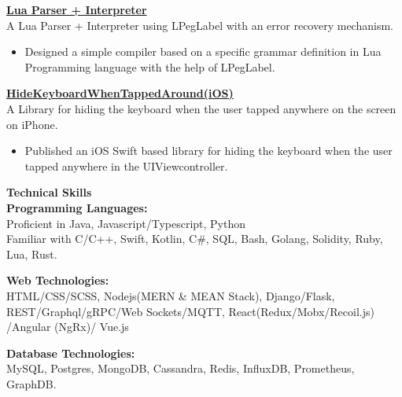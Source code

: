 \documentclass{article}
\begin{document}
\noindent \normalsize \href{https://gist.github.com/0a9d7b1a040249d1b525ab94198a42ac}{\textbf{Lua Parser + Interpreter}} \\
\noindent \normalsize A Lua Parser + Interpreter using LPegLabel with an error recovery mechanism.
\begin{itemize}
    \item Designed a simple compiler based on a specific grammar definition in Lua Programming language with the help of LPegLabel.
\end{itemize}
\vspace{5pt}

\noindent \normalsize \href{https://bit.ly/3a62RB4}{\textbf{HideKeyboardWhenTappedAround(iOS)}} \\
\noindent \normalsize A Library for hiding the keyboard when the user tapped anywhere on the screen on iPhone.
\begin{itemize}
    \item Published an iOS Swift based library for hiding the keyboard when the user tapped anywhere in the UIViewcontroller.
\end{itemize}
\vspace{5pt}

\noindent \large \textbf{\textcolor{NavyBlue}{Technical Skills}} \vspace{5pt} \\
\noindent \normalsize \textbf{Programming Languages:} \\
\noindent \normalsize Proficient in Java, Javascript/Typescript, Python \\
\noindent \normalsize Familiar with C/C++, Swift, Kotlin, C\#, SQL, Bash, Golang, Solidity, Ruby, Lua, Rust.
\vspace{5pt}

\noindent \normalsize \textbf{Web Technologies:} \\
\noindent \normalsize HTML/CSS/SCSS, Nodejs(MERN \& MEAN Stack), Django/Flask, REST/Graphql/gRPC/Web Sockets/MQTT, React(Redux/Mobx/Recoil.js) /Angular (NgRx)/ Vue.js
\vspace{5pt}

\noindent \normalsize \textbf{Database Technologies:} \\
\noindent \normalsize MySQL, Postgres, MongoDB, Cassandra, Redis, InfluxDB, Prometheus, GraphDB.
\vspace{5pt}
\end{document}
